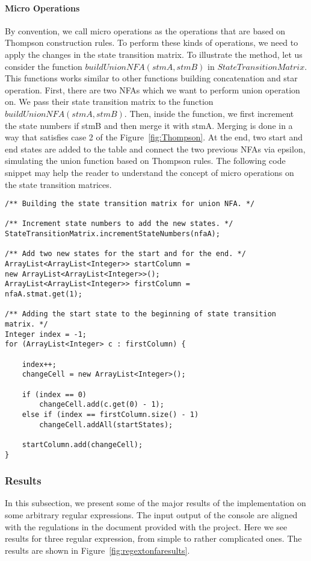 \documentclass[
12pt, %
a4paper, %
oneside, %
headinclude,footinclude, %
BCOR5mm, %
]{scrartcl}
\begin{document}
\paragraph{Micro Operations}
By convention, we call micro operations as the operations that are based on Thompson construction rules. To perform these kinds of operations, we need to apply the changes in the state transition matrix. To illustrate the method, let us consider the function $buildUnionNFA(stmA, stmB)$ in $StateTransitionMatrix$. This functions works similar to other functions building concatenation and star operation. First, there are two NFAs which we want to perform union operation on. We pass their state transition matrix to the function $buildUnionNFA(stmA, stmB)$. Then, inside the function, we first increment the state numbers if stmB and then merge it with stmA. Merging is done in a way that satisfies case 2 of the Figure~\vref{fig:Thompson}. At the end, two start and end states are added to the table and connect the two previous NFAs via epsilon, simulating the union function based on Thompson rules. The following code snippet may help the reader to understand the concept of micro operations on the state transition matrices.

\begin{lstlisting}
/** Building the state transition matrix for union NFA. */

/** Increment state numbers to add the new states. */
StateTransitionMatrix.incrementStateNumbers(nfaA);

/** Add two new states for the start and for the end. */
ArrayList<ArrayList<Integer>> startColumn =
new ArrayList<ArrayList<Integer>>();
ArrayList<ArrayList<Integer>> firstColumn =
nfaA.stmat.get(1);

/** Adding the start state to the beginning of state transition matrix. */
Integer index = -1;
for (ArrayList<Integer> c : firstColumn) {

	index++;
	changeCell = new ArrayList<Integer>();
	
	if (index == 0)
		changeCell.add(c.get(0) - 1);
	else if (index == firstColumn.size() - 1)
		changeCell.addAll(startStates);
	
	startColumn.add(changeCell);
}
\end{lstlisting}

\subsubsection{Results}
In this subsection, we present some of the major results of the implementation on some arbitrary regular expressions. The input output of the console are aligned with the regulations in the document provided with the project. Here we see results for three regular expression, from simple to rather complicated ones. The results are shown in Figure~\vref{fig:regextonfaresults}.
\end{document}
